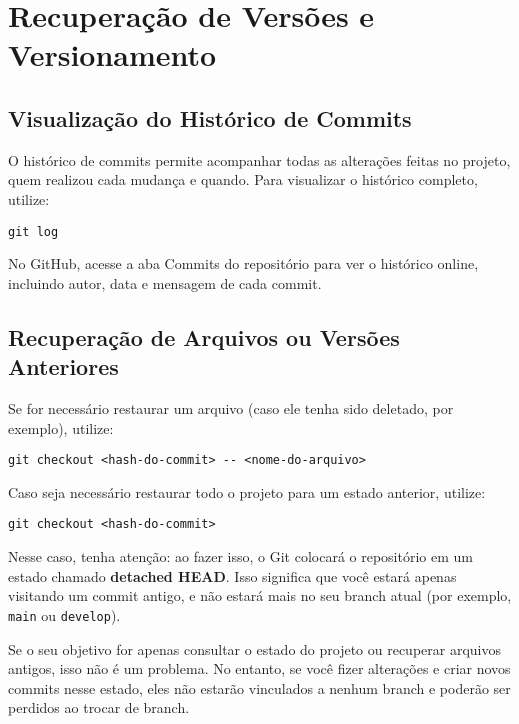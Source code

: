 \newpage

\section{Recuperação de Versões e Versionamento}

\subsection{Visualização do Histórico de Commits}

O histórico de commits permite acompanhar todas as alterações feitas no projeto, quem realizou cada mudança e quando. Para visualizar o histórico completo, utilize:

\begin{lstlisting}[style=shellstyle]
git log
\end{lstlisting}

No GitHub, acesse a aba Commits do repositório para ver o histórico online, incluindo autor, data e mensagem de cada commit.

\subsection{Recuperação de Arquivos ou Versões Anteriores}

Se for necessário restaurar um arquivo (caso ele tenha sido deletado, por exemplo), utilize:

\begin{lstlisting}[style=shellstyle]
git checkout <hash-do-commit> -- <nome-do-arquivo>
\end{lstlisting}

Caso seja necessário restaurar todo o projeto para um estado anterior, utilize:

\begin{lstlisting}[style=shellstyle]
git checkout <hash-do-commit>
\end{lstlisting}

Nesse caso, tenha atenção: ao fazer isso, o Git colocará o repositório em um estado chamado \textbf{detached HEAD}. Isso significa que você estará apenas visitando um commit antigo, e não estará mais no seu branch atual (por exemplo, \texttt{main} ou \texttt{develop}).  

Se o seu objetivo for apenas consultar o estado do projeto ou recuperar arquivos antigos, isso não é um problema. No entanto, se você fizer alterações e criar novos commits nesse estado, eles não estarão vinculados a nenhum branch e poderão ser perdidos ao trocar de branch.  


